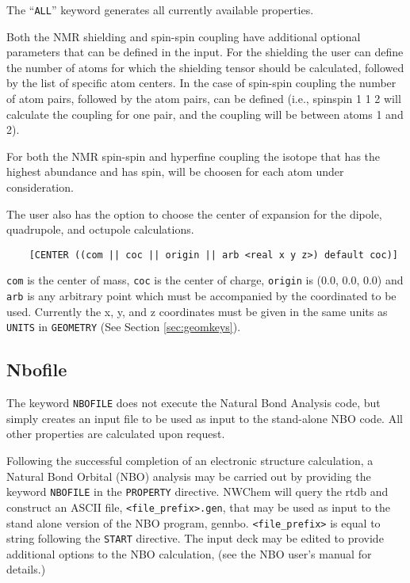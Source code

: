 The ``{\tt ALL}'' keyword generates all currently available properties. 

Both the NMR shielding and spin-spin coupling have additional optional
parameters that can be defined in the input. For the shielding the user
can define the number of atoms for which the shielding tensor should be 
calculated, followed by the list of specific atom centers. In the case 
of spin-spin coupling the number of atom pairs, followed by the atom
pairs, can be defined (i.e., spinspin 1 1 2 will calculate the coupling 
for one pair, and the coupling will be between atoms 1 and 2).

For both the NMR spin-spin and hyperfine coupling the isotope that has 
the highest abundance and has spin, will be choosen for each atom under
consideration.

The user also has the option to choose the center of expansion for
the dipole, quadrupole, and octupole calculations.

\begin{verbatim}
    [CENTER ((com || coc || origin || arb <real x y z>) default coc)]
\end{verbatim}

\verb+com+ is the center of mass, \verb+coc+ is the center of charge, \verb+origin+ is 
(0.0, 0.0, 0.0) and \verb+arb+ is any arbitrary point which must be accompanied
by the coordinated to be used.  Currently the x, y, and z coordinates
must be given in the same units as \verb+UNITS+ in \verb+GEOMETRY+ (See Section
\ref{sec:geomkeys}).

\subsection{Nbofile}
\label{sec:Nbofile}

The keyword {\tt NBOFILE} does not execute the Natural Bond Analysis
code, but simply creates an input file to be used as input to the
stand-alone NBO code.  All other properties are calculated upon
request.

Following the successful completion of an electronic structure
calculation, a Natural Bond Orbital (NBO) analysis may be carried out
by providing the keyword \verb+NBOFILE+ in the \verb+PROPERTY+ directive.  
NWChem will query the rtdb and construct an ASCII file,
\verb+<file_prefix>.gen+, that may be used as input to the stand alone
version of the NBO program, gennbo.  \verb+<file_prefix>+ is equal to
string following the \verb+START+ directive.  The input deck may be edited
to provide additional options to the NBO calculation, (see the NBO
user's manual for details.)  

